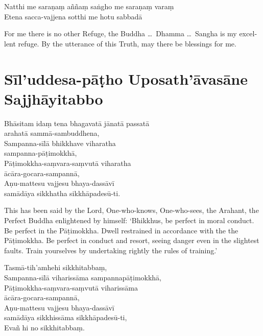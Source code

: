 Natthi me saraṇaṃ aññaṃ saṅgho me saraṇaṃ varaṃ\\
Etena sacca-vajjena sotthi me hotu sabbadā


\begin{english}
  For me there is no other Refuge, the Buddha \ldots\ Dhamma \ldots\ Sangha is
  my excellent refuge. By the utterance of this Truth, may there be blessings
  for me.
\end{english}

\section[Sīl'uddesa-pāṭho]{Sīl'uddesa-pāṭho Uposath'āvasāne Sajjhāyitabbo}

\begin{leader}
\end{leader}


Bhāsitam idaṃ tena bhagavatā jānatā passatā\\
arahatā sammā-sambuddhena,\\
Sampanna-sīlā bhikkhave viharatha\\
sampanna-pāṭimokkhā,\\
Pāṭimokkha-saṃvara-saṃvutā viharatha\\
ācāra-gocara-sampannā,\\
Aṇu-mattesu vajjesu bhaya-dassāvī\\
samādāya sikkhatha sikkhāpadesū-ti.


\begin{english}
  This has been said by the Lord, One-who-knows, One-who-sees, the Arahant, the
  Perfect Buddha enlightened by himself: `Bhikkhus, be perfect in moral
  conduct. Be perfect in the Pāṭimokkha. Dwell restrained in accordance with the
  the Pāṭimokkha. Be perfect in conduct and resort, seeing danger even in the
  slightest faults. Train yourselves by undertaking rightly the rules of training.'
\end{english}

Tasmā-tih'amhehi sikkhitabbaṃ,\\
Sampanna-sīlā viharissāma sampannapāṭimokkhā,\\
Pāṭimokkha-saṃvara-saṃvutā viharissāma\\
ācāra-gocara-sampannā,\\
Aṇu-mattesu vajjesu bhaya-dassāvī\\
samādāya sikkhissāma sikkhāpadesū-ti,\\
Evañ hi no sikkhitabbaṃ.

